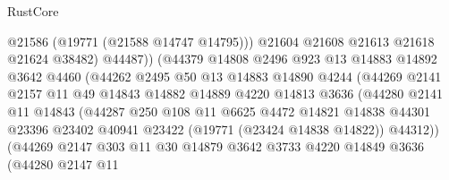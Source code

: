 \begin{lexlean}{RustCore}
\begin{coremodule}
                                @21586
                                (@19771 (@21588 @14747 @14795)))
                              @21604
                              @21608
                              @21613
                              @21618
                              @21624
                              @38482)
                            @44487))
                        (@44379
                          @14808
                          @2496
                          @923
                          @13
                          @14883
                          @14892
                          @3642
                          @4460
                          (@44262
                            @2495
                            @50
                            @13
                            @14883
                            @14890
                            @4244
                            (@44269
                              @2141
                              @2157
                              @11
                              @49
                              @14843
                              @14882
                              @14889
                              @4220
                              @14813
                              @3636
                              (@44280
                                @2141
                                @11
                                @14843
                                (@44287
                                  @250
                                  @108
                                  @11
                                  @6625
                                  @4472
                                  @14821
                                  @14838
                                  @44301
                                  @23396
                                  @23402
                                  @40941
                                  @23422
                                  (@19771 (@23424 @14838 @14822))
                                  @44312))
                              (@44269
                                @2147
                                @303
                                @11
                                @30
                                @14879
                                @3642
                                @3733
                                @4220
                                @14849
                                @3636
                                (@44280
                                  @2147
                                  @11

\end{coremodule}
\end{lexlean}
